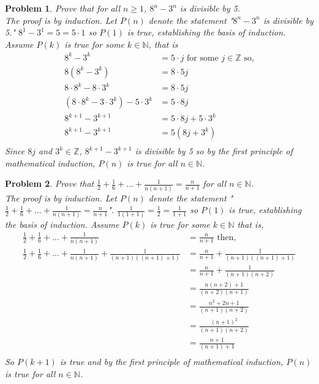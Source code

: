 \documentclass{article}
\newtheorem{Problem}{Problem}
\begin{document}
\begin{Problem}
Prove that for all $n\geq 1$, $8^n-3^n$ is divisible by 5. \\
The proof is by induction.  Let $P(n)$ denote the statement "$8^n-3^n$ is divisible by 5."  $8^1-3^1=5=5\cdot1$ so $P(1)$ is true, establishing the basis of induction.  Assume $P(k)$ is true for some $k\in\mathbb{N}$, that is \\
\begin{align*}
    8^k-3^k&=5\cdot j\text{ for some }j\in\mathbb{Z}\text{ so,} \\
    8(8^k-3^k)&=8\cdot 5j \\
    8\cdot8^k-8\cdot3^k&=8\cdot 5j \\
    (8\cdot 8^k-3\cdot 3^k)-5\cdot 3^k&=5\cdot 8j \\
    8^{k+1}-3^{k+1}&=5\cdot 8j+5\cdot 3^k \\
    8^{k+1}-3^{k+1}&=5(8j+3^k) \\
\end{align*}
Since $8j$ and $3^k\in\mathbb{Z}$, $8^{k+1}-3^{k+1}$ is divisible by 5 so by the first principle of mathematical induction, $P(n)$ is true for all $n\in\mathbb{N}$.
\end{Problem}
\pagebreak
\begin{Problem}
Prove that $\frac{1}{2}+\frac{1}{6}+...+\frac{1}{n(n+1)}=\frac{n}{n+1}$ for all $n\in\mathbb{N}$. \\
The proof is by induction.  Let $P(n)$ denote the statement "$\frac{1}{2}+\frac{1}{6}+...+\frac{1}{n(n+1)}=\frac{n}{n+1}$". $\frac{1}{1(1+1)}=\frac{1}{2}=\frac{1}{1+1}$ so $P(1)$ is true, establishing the basis of induction.  Assume $P(k)$ is true for some $k\in\mathbb{N}$ that is, \\
\begin{align*}
    \frac{1}{2}+\frac{1}{6}+...+\frac{1}{n(n+1)}&=\frac{n}{n+1}\text{ then,} \\
    \frac{1}{2}+\frac{1}{6}+...+\frac{1}{n(n+1)}+\frac{1}{(n+1)((n+1)+1)}&=\frac{n}{n+1}+\frac{1}{(n+1)((n+1)+1)} \\
    &=\frac{n}{n+1}+\frac{1}{(n+1)(n+2)} \\
    &=\frac{n(n+2)+1}{(n+2)(n+1)} \\
    &=\frac{n^2+2n+1}{(n+1)(n+2)} \\
    &=\frac{(n+1)^2}{(n+1)(n+2)} \\
    &=\frac{n+1}{(n+1)+1} \\
\end{align*}
So $P(k+1)$ is true and by the first principle of mathematical induction, $P(n)$ is true for all $n\in\mathbb{N}$.
\end{Problem}
\end{document}
